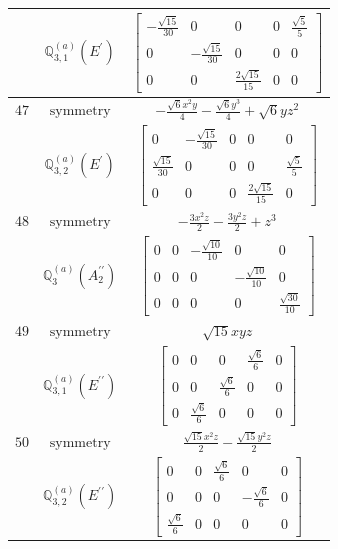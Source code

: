 \documentclass[fleqn,8pt,landscape]{jsarticle}
\begin{document}
\begin{longtable}{ccc}
$  $ & $ \mathbb{Q}_{3,1}^{(a)}(E^{\prime}) $ & $ \begin{bmatrix} - \frac{\sqrt{15}}{30} & 0 & 0 & 0 & \frac{\sqrt{5}}{5} \\ 0 & - \frac{\sqrt{15}}{30} & 0 & 0 & 0 \\ 0 & 0 & \frac{2 \sqrt{15}}{15} & 0 & 0 \end{bmatrix} $ \\ \hline
$ 47 $ & $ \text{symmetry} $ & $ - \frac{\sqrt{6} x^{2} y}{4} - \frac{\sqrt{6} y^{3}}{4} + \sqrt{6} y z^{2} $ \\
$  $ & $ \mathbb{Q}_{3,2}^{(a)}(E^{\prime}) $ & $ \begin{bmatrix} 0 & - \frac{\sqrt{15}}{30} & 0 & 0 & 0 \\ \frac{\sqrt{15}}{30} & 0 & 0 & 0 & \frac{\sqrt{5}}{5} \\ 0 & 0 & 0 & \frac{2 \sqrt{15}}{15} & 0 \end{bmatrix} $ \\ \hline
$ 48 $ & $ \text{symmetry} $ & $ - \frac{3 x^{2} z}{2} - \frac{3 y^{2} z}{2} + z^{3} $ \\
$  $ & $ \mathbb{Q}_{3}^{(a)}(A_{2}^{\prime\prime}) $ & $ \begin{bmatrix} 0 & 0 & - \frac{\sqrt{10}}{10} & 0 & 0 \\ 0 & 0 & 0 & - \frac{\sqrt{10}}{10} & 0 \\ 0 & 0 & 0 & 0 & \frac{\sqrt{30}}{10} \end{bmatrix} $ \\ \hline
$ 49 $ & $ \text{symmetry} $ & $ \sqrt{15} x y z $ \\
$  $ & $ \mathbb{Q}_{3,1}^{(a)}(E^{\prime\prime}) $ & $ \begin{bmatrix} 0 & 0 & 0 & \frac{\sqrt{6}}{6} & 0 \\ 0 & 0 & \frac{\sqrt{6}}{6} & 0 & 0 \\ 0 & \frac{\sqrt{6}}{6} & 0 & 0 & 0 \end{bmatrix} $ \\ \hline
$ 50 $ & $ \text{symmetry} $ & $ \frac{\sqrt{15} x^{2} z}{2} - \frac{\sqrt{15} y^{2} z}{2} $ \\
$  $ & $ \mathbb{Q}_{3,2}^{(a)}(E^{\prime\prime}) $ & $ \begin{bmatrix} 0 & 0 & \frac{\sqrt{6}}{6} & 0 & 0 \\ 0 & 0 & 0 & - \frac{\sqrt{6}}{6} & 0 \\ \frac{\sqrt{6}}{6} & 0 & 0 & 0 & 0 \end{bmatrix} $ \\ \hline

\end{longtable}
\end{document}
